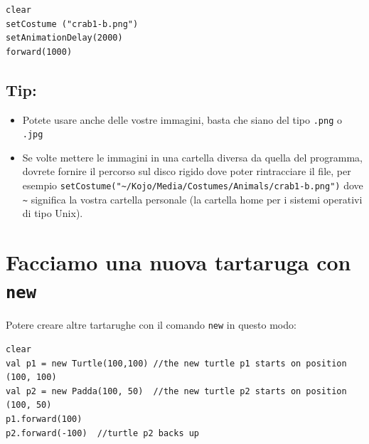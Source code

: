 \begin{lstlisting}[basicstyle={\ttfamily\fontsize{20}{24}\selectfont},numbers=none]
clear
setCostume ("crab1-b.png")  
setAnimationDelay(2000)
forward(1000)
\end{lstlisting}
        
\section*{\color{OliveGreen}Tip:}


\begin{itemize}

\item {Potete usare anche delle vostre immagini, basta che siano del tipo \lstinline{.png} o \lstinline{.jpg}}
\item {Se volte mettere le immagini in una cartella diversa da quella del programma, dovrete fornire il percorso sul disco rigido dove poter rintracciare il file, per esempio \lstinline{setCostume("~/Kojo/Media/Costumes/Animals/crab1-b.png")} dove \lstinline{~} significa la vostra cartella personale (la cartella home per i sistemi operativi di tipo Unix).}

\end{itemize}


\chapter{Facciamo una nuova tartaruga con \lstinline{new}}Potere creare altre tartarughe con il comando \lstinline{new} in questo modo:

\begin{lstlisting}[basicstyle={\ttfamily\fontsize{18}{22}\selectfont},numbers=none]
clear
val p1 = new Turtle(100,100) //the new turtle p1 starts on position (100, 100)
val p2 = new Padda(100, 50)  //the new turtle p2 starts on position (100, 50)
p1.forward(100)
p2.forward(-100)  //turtle p2 backs up
\end{lstlisting}
        

  
